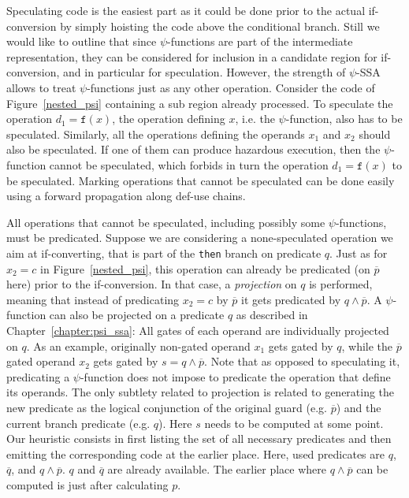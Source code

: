 Speculating code is the easiest part as it could be done prior to the actual if-conversion by simply hoisting the code above the conditional branch. Still we would like to outline that since $\psi$-functions are part of the intermediate representation, they can be considered for inclusion in a candidate region for if-conversion, and in particular for speculation. However, the strength of $\psi$-SSA allows to treat $\psi$-functions just as any other operation. Consider the code of Figure~\ref{nested_psi} containing a sub region already processed. To speculate the operation $d_1=\texttt{f}(x)$, the operation defining $x$, i.e. the $\psi$-function, also has to be speculated. Similarly, all the operations defining the operands $x_1$ and $x_2$ should also be speculated. If one of them can produce hazardous execution, then the $\psi$-function cannot be speculated, which forbids in turn the operation $d_1=\texttt{f}(x)$ to be speculated. Marking operations that cannot be speculated can be done easily using a forward propagation along def-use chains.

All operations that cannot be speculated, including possibly some $\psi$-functions, must be predicated. Suppose we are considering a none-speculated operation we aim at if-converting, that is part of the \texttt{then} branch on predicate $q$. Just as for $x_2=c$ in Figure~\ref{nested_psi}, this operation can already be predicated (on $\overline{p}$ here) prior to the if-conversion. In that case, a \textit{projection} on $q$ is performed, meaning that instead of predicating $x_2=c$ by $\overline{p}$ it gets predicated by $q\wedge \overline{p}$. A $\psi$-function can also be projected on a predicate $q$ as described in Chapter~\ref{chapter:psi_ssa}: All gates of each operand are individually projected on $q$. As an example, originally non-gated operand $x_1$ gets gated by $q$, while the $\overline{p}$ gated operand $x_2$ gets gated by $s=q\wedge\overline{p}$. Note that as opposed to speculating it, predicating a $\psi$-function does not impose to predicate the operation that define its operands. The only subtlety related to projection is related to generating the new predicate as the logical conjunction of the original guard (e.g. $\overline{p}$) and the current branch predicate (e.g. $q$). Here $s$ needs to be computed at some point. Our heuristic consists in first listing the set of all necessary predicates and then emitting the corresponding code at the earlier place. Here, used predicates are $q$, $\overline{q}$, and $q\wedge\overline{p}$. $q$ and $\overline{q}$ are already available. The earlier place where $q\wedge\overline{p}$ can be computed is just after calculating $p$.

